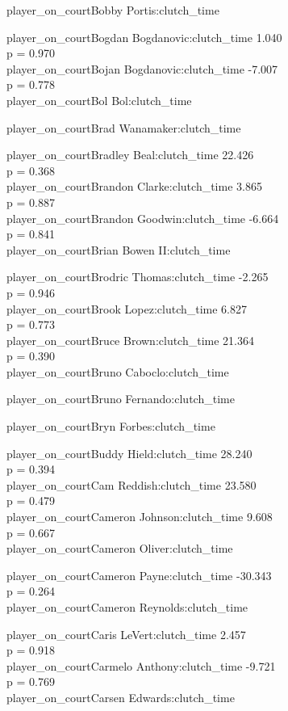 \documentclass[
  landscape]{article}
\begin{document}
player\_on\_courtBobby Portis:clutch\_time

player\_on\_courtBogdan Bogdanovic:clutch\_time 1.040\\
p = 0.970\\
player\_on\_courtBojan Bogdanovic:clutch\_time -7.007\\
p = 0.778\\
player\_on\_courtBol Bol:clutch\_time

player\_on\_courtBrad Wanamaker:clutch\_time

player\_on\_courtBradley Beal:clutch\_time 22.426\\
p = 0.368\\
player\_on\_courtBrandon Clarke:clutch\_time 3.865\\
p = 0.887\\
player\_on\_courtBrandon Goodwin:clutch\_time -6.664\\
p = 0.841\\
player\_on\_courtBrian Bowen II:clutch\_time

player\_on\_courtBrodric Thomas:clutch\_time -2.265\\
p = 0.946\\
player\_on\_courtBrook Lopez:clutch\_time 6.827\\
p = 0.773\\
player\_on\_courtBruce Brown:clutch\_time 21.364\\
p = 0.390\\
player\_on\_courtBruno Caboclo:clutch\_time

player\_on\_courtBruno Fernando:clutch\_time

player\_on\_courtBryn Forbes:clutch\_time

player\_on\_courtBuddy Hield:clutch\_time 28.240\\
p = 0.394\\
player\_on\_courtCam Reddish:clutch\_time 23.580\\
p = 0.479\\
player\_on\_courtCameron Johnson:clutch\_time 9.608\\
p = 0.667\\
player\_on\_courtCameron Oliver:clutch\_time

player\_on\_courtCameron Payne:clutch\_time -30.343\\
p = 0.264\\
player\_on\_courtCameron Reynolds:clutch\_time

player\_on\_courtCaris LeVert:clutch\_time 2.457\\
p = 0.918\\
player\_on\_courtCarmelo Anthony:clutch\_time -9.721\\
p = 0.769\\
player\_on\_courtCarsen Edwards:clutch\_time
\end{document}
